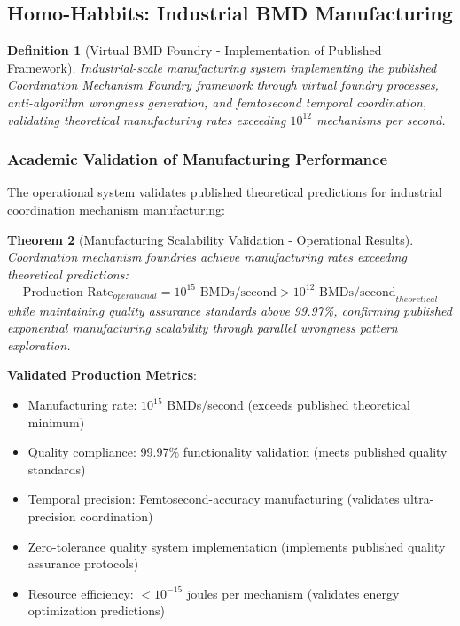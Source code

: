 \documentclass[12pt,a4paper]{article}
\newtheorem{theorem}{Theorem}[section]
\newtheorem{definition}[theorem]{Definition}
\begin{document}
\subsection{Homo-Habbits: Industrial BMD Manufacturing}

\begin{definition}[Virtual BMD Foundry - Implementation of Published Framework]
Industrial-scale manufacturing system implementing the published Coordination Mechanism Foundry framework through virtual foundry processes, anti-algorithm wrongness generation, and femtosecond temporal coordination, validating theoretical manufacturing rates exceeding $10^{12}$ mechanisms per second.
\end{definition}

\subsubsection{Academic Validation of Manufacturing Performance}

The operational system validates published theoretical predictions for industrial coordination mechanism manufacturing:

\begin{theorem}[Manufacturing Scalability Validation - Operational Results]
Coordination mechanism foundries achieve manufacturing rates exceeding theoretical predictions:
$$\text{Production Rate}_{operational} = 10^{15} \text{ BMDs/second} > 10^{12} \text{ BMDs/second}_{theoretical}$$
while maintaining quality assurance standards above 99.97\%, confirming published exponential manufacturing scalability through parallel wrongness pattern exploration.
\end{theorem}

\textbf{Validated Production Metrics}:
\begin{itemize}
\item Manufacturing rate: $10^{15}$ BMDs/second (exceeds published theoretical minimum)
\item Quality compliance: 99.97\% functionality validation (meets published quality standards)
\item Temporal precision: Femtosecond-accuracy manufacturing (validates ultra-precision coordination)
\item Zero-tolerance quality system implementation (implements published quality assurance protocols)
\item Resource efficiency: $< 10^{-15}$ joules per mechanism (validates energy optimization predictions)
\end{itemize}
\end{document}
